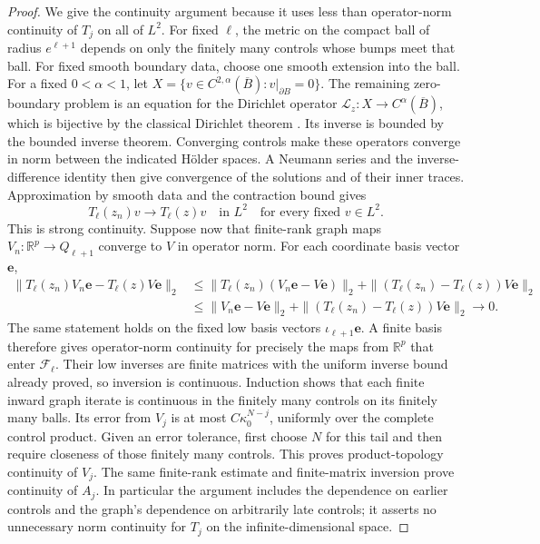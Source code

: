 \begin{proof}
We give the continuity argument because it uses less than operator-norm
continuity of \(T_j\) on all of \(L^2\).  For fixed \(\ell\), the metric on
the compact ball of radius \(e^{\ell+1}\) depends on only the finitely many
controls whose bumps meet that ball.  For fixed smooth boundary data, choose
one smooth extension into the ball.  For a fixed \(0<\alpha<1\), let
\(X=\{v\in C^{2,\alpha}(\overline B):v|_{\partial B}=0\}\).
The remaining zero-boundary problem is an equation for the Dirichlet
operator \(\mathcal L_z:X\to C^\alpha(\overline B)\), which is bijective by
the classical Dirichlet theorem
\cite[Theorem~6.14, p.~107]{GilbargTrudinger}.  Its inverse is bounded by
the bounded inverse theorem.  Converging controls make these operators
converge in norm between the indicated Hölder spaces.  A Neumann series
and the inverse-difference identity then give convergence of the solutions
and of their inner traces.  Approximation by smooth data and the contraction
bound gives
\[
 T_\ell(z_n)v\longrightarrow T_\ell(z)v
 \quad\text{in }L^2
 \quad\text{for every fixed }v\in L^2.
\]
This is strong continuity.  Suppose now that finite-rank graph maps
\(V_n:\mathbb R^p\to Q_{\ell+1}\) converge to \(V\) in operator norm.
For each coordinate basis vector \(\mathbf e\),
\begin{align*}
 \|T_\ell(z_n)V_n\mathbf e-T_\ell(z)V\mathbf e\|_2
 &\leq
   \|T_\ell(z_n)(V_n\mathbf e-V\mathbf e)\|_2
   +\|(T_\ell(z_n)-T_\ell(z))V\mathbf e\|_2\\
 &\leq\|V_n\mathbf e-V\mathbf e\|_2
   +\|(T_\ell(z_n)-T_\ell(z))V\mathbf e\|_2
 \longrightarrow0.
\end{align*}
The same statement holds on the fixed low basis vectors
\(\iota_{\ell+1}\mathbf e\).  A finite basis therefore gives operator-norm
continuity for precisely the maps from \(\mathbb R^p\) that enter
\(\mathcal F_\ell\).  Their low inverses are finite matrices with the
uniform inverse bound already proved, so inversion is continuous.
Induction shows that each finite inward graph iterate is continuous in the
finitely many controls on its finitely many balls.  Its error from \(V_j\)
is at most \(C\kappa_0^{N-j}\), uniformly over the complete control product.
Given an error tolerance, first choose \(N\) for this tail and then require
closeness of those finitely many controls.  This proves product-topology
continuity of \(V_j\).  The same finite-rank estimate and finite-matrix
inversion prove continuity of \(A_j\).  In particular the argument includes
the dependence on earlier controls and the graph's dependence on arbitrarily
late controls; it asserts no unnecessary norm continuity for \(T_j\) on
the infinite-dimensional space.
\end{proof}

